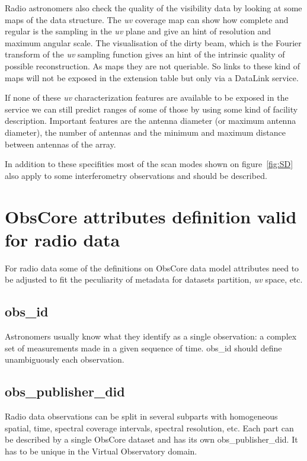 \documentclass[11pt,a4paper]{ivoa}
\begin{document}
Radio astronomers also check the quality of the visibility data by looking at some maps of
the data structure. The \emph{uv} coverage map can show how complete and regular is the sampling in
the \emph{uv} plane and give an hint of resolution and maximum angular scale.
The visualisation of the dirty beam, which is the Fourier transform of the \emph{uv} sampling
function gives an hint of the intrinsic quality of possible reconstruction. As maps they are
not queriable. So links to these kind of maps will not be exposed in the extension
table but only via a DataLink service.

If none of these \emph{uv} characterization features are available to be exposed in the service
we can still predict ranges of some of those by using some kind of facility description. 
Important features are the antenna diameter (or maximum antenna diameter), the number of
antennas and the minimum and maximum distance between antennas of the array.

In addition to these specifities most of the scan modes shown on figure~\ref{fig:SD} also
apply to some interferometry observations and should be described.

\section{ObsCore attributes definition valid for radio data}
\label{sec:ObsCoreRadDef}

For radio data some of the definitions on ObsCore data model attributes need to be adjusted
to fit the peculiarity of metadata for datasets partition, \emph{uv} space, etc.

\subsection{obs\_id}

Astronomers usually know what they identify as a single observation: a complex set of
measurements made in a given sequence of time. obs\_id should define unambiguously each
observation.

\subsection{obs\_publisher\_did}

Radio data observations can be split in several subparts with homogeneous spatial,
time, spectral coverage intervals, spectral resolution, etc. Each part can be described by
a single ObsCore dataset and has its own obs\_publisher\_did. It has to be unique in the
Virtual Observatory domain.
\end{document}
